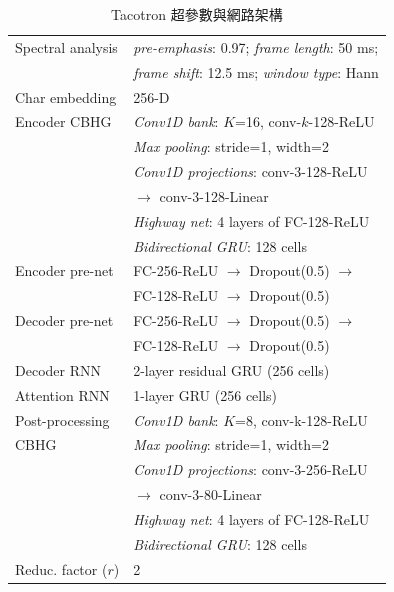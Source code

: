 \begin{table}[H]
    \centering
    \setlength{\tabcolsep}{2pt}
    \scriptsize
    \begin{tabular}{|l|l|}
    \hline
    Spectral analysis & \emph{pre-emphasis}: 0.97; \emph{frame length}: 50 ms; \\
                                        & \emph{frame shift}: 12.5 ms; \emph{window type}: Hann \\ \hline
    Char embedding    & 256-D \\ \hline
    Encoder CBHG      & \emph{Conv1D bank}: $K$=16, conv-$k$-128-ReLU \\
                                        & \emph{Max pooling}: stride=1, width=2 \\
                                        & \emph{Conv1D projections}: conv-3-128-ReLU \\
                                        & $\rightarrow$ conv-3-128-Linear \\
                                        & \emph{Highway net}: 4 layers of FC-128-ReLU \\
                                        & \emph{Bidirectional GRU}: 128 cells \\ \hline
    Encoder pre-net   & FC-256-ReLU $\rightarrow$ Dropout(0.5) $\rightarrow$ \\
                                        & FC-128-ReLU $\rightarrow$ Dropout(0.5) \\ \hline
    Decoder pre-net   & FC-256-ReLU $\rightarrow$ Dropout(0.5) $\rightarrow$ \\
                                        & FC-128-ReLU $\rightarrow$ Dropout(0.5) \\ \hline
    Decoder RNN       & 2-layer residual GRU (256 cells) \\ \hline
    Attention RNN     & 1-layer GRU (256 cells) \\ \hline
    Post-processing   & \emph{Conv1D bank}: $K$=8, conv-k-128-ReLU \\
    CBHG              & \emph{Max pooling}: stride=1, width=2 \\
                                        & \emph{Conv1D projections}: conv-3-256-ReLU \\
                                        & $\rightarrow$ conv-3-80-Linear \\
                                        & \emph{Highway net}: 4 layers of FC-128-ReLU \\
                                        & \emph{Bidirectional GRU}: 128 cells \\ \hline
    Reduc. factor ($r$) & 2 \\ \hline
    \end{tabular}
    \caption{Tacotron 超參數與網路架構\cite{wang2017tacotron}}
    \label{tb.params}
\end{table}

